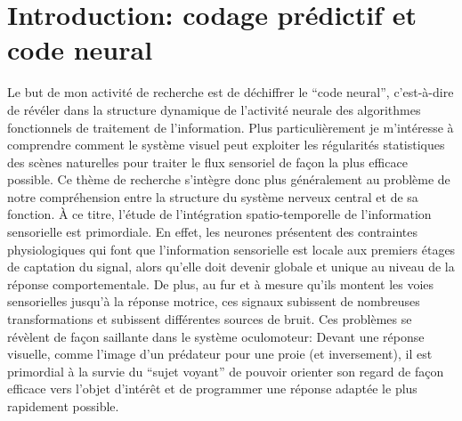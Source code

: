 \documentclass[11pt,french,a4paper,oneside]{article}%
\begin{document}
\section{Introduction: codage prédictif et code neural}%
Le but de mon activité de recherche est de déchiffrer le ``code neural'', c'est-à-dire de révéler dans la structure dynamique de l'activité neurale des algorithmes fonctionnels de traitement de l'information. Plus particulièrement je m'intéresse à comprendre comment le système visuel peut exploiter les régularités statistiques des scènes naturelles pour traiter le flux sensoriel de façon la plus efficace possible. Ce thème de recherche s'intègre donc plus généralement au problème de notre compréhension entre la structure du système nerveux central et de sa fonction. %
%
À ce titre, l'étude de l'intégration spatio-temporelle de l'information sensorielle est primordiale. En effet, les neurones présentent des contraintes physiologiques qui font que l'information sensorielle est locale aux premiers étages de captation du signal, alors qu'elle doit devenir globale et unique au niveau de la réponse comportementale. De plus, au fur et à mesure qu'ils montent les voies sensorielles jusqu'à la réponse motrice, ces signaux subissent de nombreuses transformations et subissent différentes sources de bruit. Ces problèmes se révèlent de façon saillante dans le système oculomoteur: Devant une réponse visuelle, comme l'image d'un prédateur pour une proie (et inversement), il est primordial à la survie du ``sujet voyant'' de pouvoir orienter son regard de façon efficace vers l'objet d'intérêt et de programmer une réponse adaptée le plus rapidement possible. %
\end{document}
